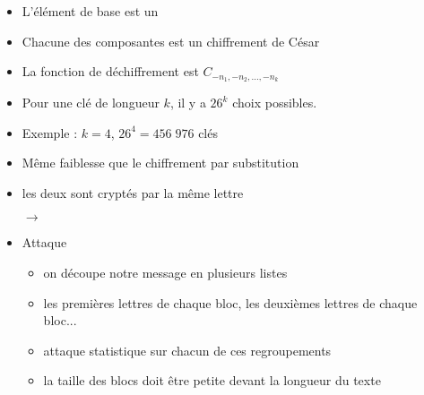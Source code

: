 \begin{frame}

\hfill\hfill{}

\begin{itemize}\setlength{\itemsep}{8pt}
  \item L'élément de base est un 
  \pause
  \bigskip
  
\hspace*{-2em}
  \pause
  \item Chacune des composantes est un chiffrement de César
  \pause
  \item La fonction de déchiffrement est $C_{-n_1,-n_2,\ldots,-n_k}$
\end{itemize}

\end{frame}


\begin{frame}

\hfill\hfill{}

\pause

\begin{itemize}\setlength{\itemsep}{8pt}
  \item Pour une clé de longueur $k$, il y a $26^k$ choix possibles.
  \pause
  \item Exemple : $k=4$, $26^4 = 456\;976$ clés
  \pause
  \item Même faiblesse que le chiffrement par substitution
  \pause
  \item {} \pause les deux  sont cryptés par la même lettre
\begin{center} $\longrightarrow$  \end{center}
  \pause
  \item Attaque 
  \pause
  \begin{itemize}
    \item on découpe notre message en plusieurs listes
    \pause
    \item les premières lettres de chaque bloc, les deuxièmes lettres de chaque bloc...
    \pause
    \item attaque statistique sur chacun de ces regroupements
    \pause
    \item la taille des blocs doit être petite devant la longueur du texte
  \end{itemize}
  
\end{itemize}

\end{frame}




